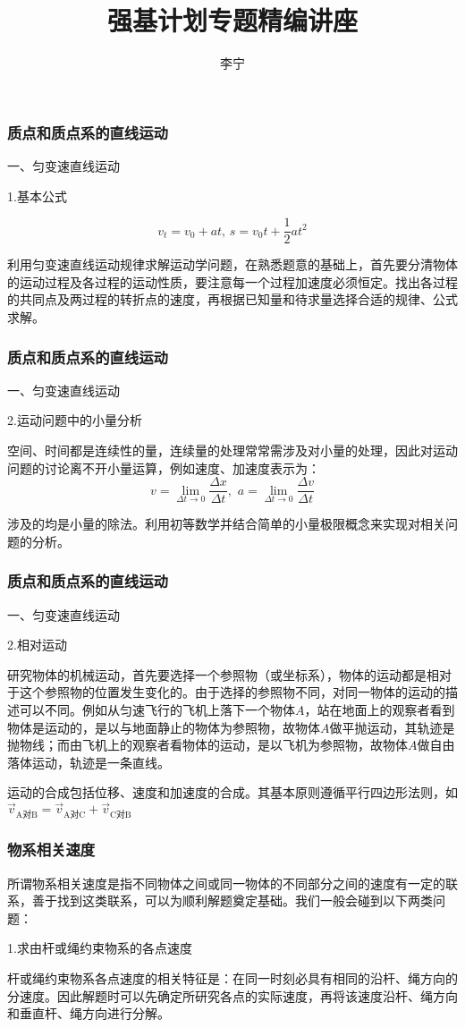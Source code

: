 \documentclass{beamer}
\title{强基计划专题精编讲座}
\author{李宁}
\institute{山东省青岛第五十八中学}
\begin{document}
\frame{\titlepage}

\begin{frame}
\frametitle{质点和质点系的直线运动}
一、匀变速直线运动

1.基本公式

\begin{equation}
    v_t=v_0+at,\,s=v_0 t+\frac{1}{2}at^2
\end{equation}

利用匀变速直线运动规律求解运动学问题，在熟悉题意的基础上，首先要分清物体的运动过程及各过程的运动性质，要注意每一个过程加速度必须恒定。找出各过程的共同点及两过程的转折点的速度，再根据已知量和待求量选择合适的规律、公式求解。
\end{frame}
\begin{frame}
    \frametitle{质点和质点系的直线运动}
    一、匀变速直线运动
    
    2.运动问题中的小量分析
    
    空间、时间都是连续性的量，连续量的处理常常需涉及对小量的处理，因此对运动问题的讨论离不开小量运算，例如速度、加速度表示为：
    \begin{equation}
        v=\lim_{\Delta t\to 0} \frac{\Delta x}{\Delta t},\,\,a=\lim_{\Delta t\to 0}\frac{\Delta v}{\Delta t}
    \end{equation}

    涉及的均是小量的除法。利用初等数学并结合简单的小量极限概念来实现对相关问题的分析。
    \end{frame}
    \begin{frame}
        \frametitle{质点和质点系的直线运动}
        一、匀变速直线运动
        
        2.相对运动
        
        研究物体的机械运动，首先要选择一个参照物（或坐标系），物体的运动都是相对于这个参照物的位置发生变化的。由于选择的参照物不同，对同一物体的运动的描述可以不同。例如从匀速飞行的飞机上落下一个物体$A$，站在地面上的观察者看到物体是运动的，是以与地面静止的物体为参照物，故物体$A$做平抛运动，其轨迹是抛物线；而由飞机上的观察者看物体的运动，是以飞机为参照物，故物体$A$做自由落体运动，轨迹是一条直线。

        运动的合成包括位移、速度和加速度的合成。其基本原则遵循平行四边形法则，如$\vec v_{\text{A对B}}=\vec v_{\text{A对C}}+\vec v_{\text{C对B}}$
    \end{frame}
    \begin{frame}
        \frametitle{物系相关速度}
        所谓物系相关速度是指不同物体之间或同一物体的不同部分之间的速度有一定的联系，善于找到这类联系，可以为顺利解题奠定基础。我们一般会碰到以下两类问题：

        1.求由杆或绳约束物系的各点速度

        杆或绳约束物系各点速度的相关特征是：在同一时刻必具有相同的沿杆、绳方向的分速度。因此解题时可以先确定所研究各点的实际速度，再将该速度沿杆、绳方向和垂直杆、绳方向进行分解。

        
    \end{frame}
\end{document}
